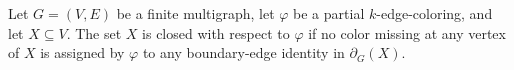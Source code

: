 \begin{definition}
Let $G=(V,E)$ be a finite multigraph, let $\varphi$ be a partial
$k$-edge-coloring, and let $X\subseteq V$.  The set $X$ is closed with
respect to $\varphi$ if no color missing at any vertex of $X$ is assigned by
$\varphi$ to any boundary-edge identity in $\partial_G(X)$.
\end{definition}
